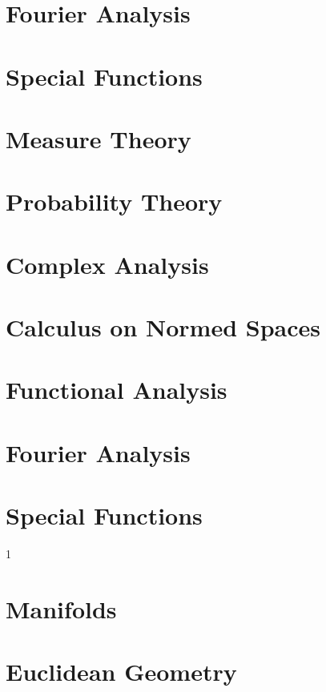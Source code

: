\documentclass{book}                                                           %
\newcommand*{\TOPPATH}{books}
\newcommand*{\PATH}{\TOPPATH/}
\newcounter{endpage}
\def\compilegeometry{1}
\begin{document}
        \part{Fourier Analysis}
            
            
        \part{Special Functions}
            
            
    \else
        \part{Measure Theory}
        \part{Probability Theory}
        \part{Complex Analysis}
        \part{Calculus on Normed Spaces}
        \part{Functional Analysis}
        \part{Fourier Analysis}
        \part{Special Functions}
    \fi
    \clearpage

    \setcounter{endpage}{\thepage}
    \label{book:Geometry}%
    \renewcommand{\PATH}{\TOPPATH/Geometry}
    \setcounter{page}{\value{endpage}}

    \if\compilegeometry1
        \part{Manifolds}
            
        \part{Euclidean Geometry}
            
\end{document}
